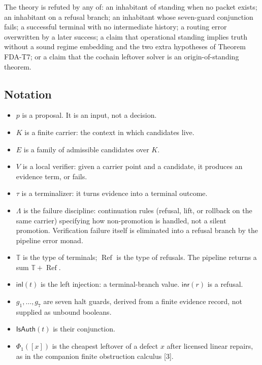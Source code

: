 \documentclass[
  11pt,
]{article}
\providecommand{\tightlist}{%
  \setlength{\itemsep}{0pt}\setlength{\parskip}{0pt}}
\begin{document}
The theory is refuted by any of: an inhabitant of standing when no packet exists; an inhabitant on a refusal branch; an inhabitant whose seven-guard conjunction fails; a successful terminal with no intermediate history; a routing error overwritten by a later success; a claim that operational standing implies truth without a sound regime embedding and the two extra hypotheses of Theorem FDA-T7; or a claim that the cochain leftover solver is an origin-of-standing theorem.

\subsection{Notation}\label{notation}

\begin{itemize}
\tightlist
\item
  \(p\) is a proposal. It is an input, not a decision.
\item
  \(K\) is a finite carrier: the context in which candidates live.
\item
  \(E\) is a family of admissible candidates over \(K\).
\item
  \(V\) is a local verifier: given a carrier point and a candidate, it produces an evidence term, or fails.
\item
  \(\tau\) is a terminalizer: it turns evidence into a terminal outcome.
\item
  \(\Lambda\) is the failure discipline: continuation rules (refusal, lift, or rollback on the same carrier) specifying how non-promotion is handled, not a silent promotion. Verification failure itself is eliminated into a refusal branch by the pipeline error monad.
\item
  \(\mathbb{T}\) is the type of terminals; \(\operatorname{Ref}\) is the type of refusals. The pipeline returns a sum \(\mathbb{T}+\operatorname{Ref}\).
\item
  \(\mathsf{inl}(t)\) is the left injection: a terminal-branch value. \(\mathsf{inr}(r)\) is a refusal.
\item
  \(g_1,\ldots,g_7\) are seven halt guards, derived from a finite evidence record, not supplied as unbound booleans.
\item
  \(\mathsf{IsAuth}(t)\) is their conjunction.
\item
  \(\Phi_1([x])\) is the cheapest leftover of a defect \(x\) after licensed linear repairs, as in the companion finite obstruction calculus {[}3{]}.
\end{itemize}
\end{document}
